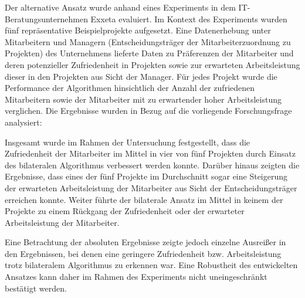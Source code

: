 Der alternative Ansatz wurde anhand eines Experiments in dem IT-Bera\-tungsunternehmen Exxeta evaluiert.
Im Kontext des Experiments wurden fünf repräsentative Beispielprojekte aufgesetzt.
Eine Datenerhebung unter Mitarbeitern und Managern (Entscheidungsträger der Mitarbeiterzuordnung zu Projekten) des Unternehmens lieferte Daten zu Präferenzen der Mitarbeiter und deren potenzieller Zufriedenheit in Projekten sowie zur erwarteten Arbeitsleistung dieser in den Projekten aus Sicht der Manager.
Für jedes Projekt wurde die Performance der Algorithmen hinsichtlich der Anzahl der zufriedenen Mitarbeitern sowie der Mitarbeiter mit zu erwartender hoher Arbeitsleistung verglichen.
Die Ergebnisse wurden in Bezug auf die vorliegende Forschungsfrage analysiert:
\forschungsfrage

Insgesamt wurde im Rahmen der Untersuchung festgestellt, dass die Zufriedenheit der Mitarbeiter im Mittel in vier von fünf Projekten durch Einsatz des bilateralen Algorithmus verbessert werden konnte.
Darüber hinaus zeigten die Ergebnisse, dass eines der fünf Projekte im Durchschnitt sogar eine Steigerung der erwarteten Arbeitsleistung der Mitarbeiter aus Sicht der Entscheidungsträger erreichen konnte.
Weiter führte der bilaterale Ansatz im Mittel in keinem der Projekte zu einem Rückgang der Zufriedenheit oder der erwarteter Arbeitsleistung der Mitarbeiter.

Eine Betrachtung der absoluten Ergebnisse zeigte jedoch einzelne Ausreißer in den Ergebnissen, bei denen eine geringere Zufriedenheit bzw. Arbeitsleistung trotz bilateralem Algorithmus zu erkennen war.
Eine Robustheit des entwickelten Ansatzes kann daher im Rahmen des Experiments nicht uneingeschränkt bestätigt werden.

